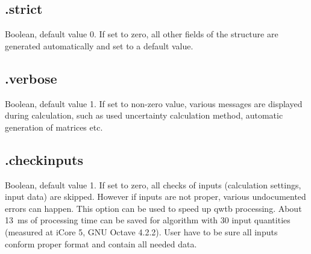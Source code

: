 \documentclass[12pt,a4paper,oneside]{report} %
\begin{document}
\subsection{\textsf{.strict}} %
\label{structcalcsetstrict}
Boolean, default value 0. If set to zero, all other fields of the structure are generated
automatically and set to a default value.

\subsection{\textsf{.verbose}} %
\label{structcalcsetverbose}
Boolean, default value 1. If set to non-zero value, various messages are displayed during
calculation, such as used uncertainty calculation method, automatic generation of matrices etc.

\subsection{\textsf{.checkinputs}} %
\label{structcalcsetverbose}
Boolean, default value 1. If set to zero, all checks of inputs (calculation settings, input data)
are skipped. However if inputs are not proper, various undocumented errors can happen. This option
can be used to speed up qwtb processing. About 13~ms of processing time can be saved for algorithm
with 30 input quantities (measured at iCore 5, GNU Octave 4.2.2). User have to be sure all inputs
conform proper format and contain all needed data.

% 
% 
\end{document}
